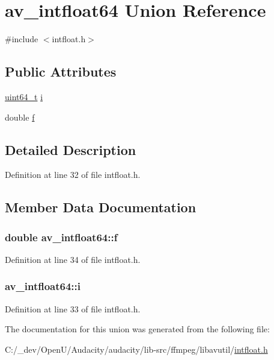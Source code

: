 \hypertarget{unionav__intfloat64}{}\section{av\+\_\+intfloat64 Union Reference}
\label{unionav__intfloat64}


{\ttfamily \#include $<$intfloat.\+h$>$}

\subsection*{Public Attributes}
\begin{DoxyCompactItemize}
\item 
\hyperlink{lib-src_2ffmpeg_2win32_2stdint_8h_aec6fcb673ff035718c238c8c9d544c47}{uint64\+\_\+t} \hyperlink{unionav__intfloat64_aa87d447f2b6de18cde7e7686a59dd0f3}{i}
\item 
double \hyperlink{unionav__intfloat64_a3c64372dfad0215930e8f18cd09a8aab}{f}
\end{DoxyCompactItemize}


\subsection{Detailed Description}


Definition at line 32 of file intfloat.\+h.



\subsection{Member Data Documentation}
\subsubsection[{\texorpdfstring{f}{f}}]{\setlength{\rightskip}{0pt plus 5cm}double av\+\_\+intfloat64\+::f}\hypertarget{unionav__intfloat64_a3c64372dfad0215930e8f18cd09a8aab}{}\label{unionav__intfloat64_a3c64372dfad0215930e8f18cd09a8aab}


Definition at line 34 of file intfloat.\+h.

\subsubsection[{\texorpdfstring{i}{i}}]{ av\+\_\+intfloat64\+::i}\hypertarget{unionav__intfloat64_aa87d447f2b6de18cde7e7686a59dd0f3}{}\label{unionav__intfloat64_aa87d447f2b6de18cde7e7686a59dd0f3}


Definition at line 33 of file intfloat.\+h.



The documentation for this union was generated from the following file\+:\begin{DoxyCompactItemize}
\item 
C\+:/\+\_\+dev/\+Open\+U/\+Audacity/audacity/lib-\/src/ffmpeg/libavutil/\hyperlink{intfloat_8h}{intfloat.\+h}\end{DoxyCompactItemize}
